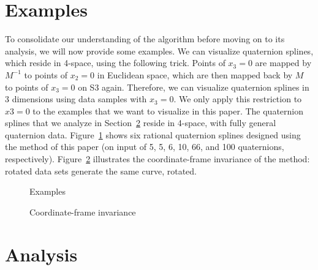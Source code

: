 \section{Examples}

To consolidate our understanding of the algorithm before moving on to its
analysis, we will now provide some examples.
We can visualize quaternion splines, which reside in 4-space,
using the following trick.
Points of $x_3=0$ are mapped by $M^{-1}$ 
to points of $x_2=0$ in Euclidean space,
which are then mapped back by $M$ to points of $x_3=0$ on S3 again.
Therefore, we can visualize quaternion splines in 3 dimensions
using data samples with $x_3=0$.
We only apply this restriction to $x3=0$ to the examples
that we want to visualize in this paper.
The quaternion splines that we analyze in Section~\ref{sec:results}
reside in 4-space, with fully general quaternion data.
Figure~\ref{fig:eg6} shows six rational quaternion splines designed using the
method of this paper (on input of 5, 5, 6, 10, 66, and 100 quaternions,
respectively).
Figure~\ref{fig:invariance} illustrates the coordinate-frame invariance
of the method: rotated data sets generate the same curve, rotated.

\begin{figure}
\vspace{5in}
\caption{Examples}
\label{fig:eg6}
\end{figure}

\begin{figure}
\vspace{3in}
\caption{Coordinate-frame invariance}
\label{fig:invariance}
\end{figure}


\section{Analysis}
\label{sec:results}

